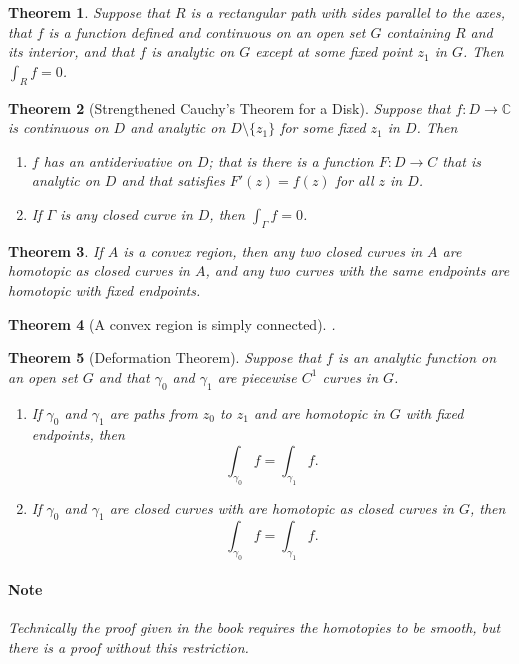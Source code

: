 \documentclass[a4paper]{article}
\newtheorem{theorem}{Theorem}
\newcommand{\C}{\mathbb{C}}
\begin{document}
\begin{theorem}
  Suppose that \(R\) is a rectangular path with sides parallel to the axes, that \(f\) is a function defined and continuous on an open set \(G\) containing \(R\) and its interior, and that \(f\) is analytic on \(G\) except at some fixed point \(z_1\) in \(G\). 
  Then \(\int_R f = 0\).
\end{theorem}






\begin{theorem}[Strengthened Cauchy's Theorem for a Disk]
  Suppose that \(f : D \to \C\) is continuous on \(D\) and analytic on \(D \setminus \{z_1\}\) for some fixed \(z_1\) in \(D\). 
  Then
  \begin{enumerate}
    \item \(f\) has an antiderivative on \(D\); that is there is a function \(F : D \to C\) that is analytic on \(D\) and that satisfies \(F'(z) = f(z)\) for all \(z\) in \(D\).
    \item If \(\Gamma\) is any closed curve in \(D\), then \(\int_\Gamma f = 0\).
  \end{enumerate}
\end{theorem}







\begin{theorem}
  If \(A\) is a convex region, then any two closed curves in \(A\) are homotopic as closed curves in \(A\), and any two curves with the same endpoints are homotopic with fixed endpoints. 
\end{theorem}

\begin{theorem}[A convex region is simply connected].
\end{theorem}

\begin{theorem}[Deformation Theorem]
  Suppose that \(f\) is an analytic function on an open set \(G\) and that \(\gamma_0\) and \(\gamma_1\) are piecewise \(C^1\) curves in \(G\). 
  \begin{enumerate}
    \item If \(\gamma_0 \) and \(\gamma_1\) are paths from \(z_0\) to \(z_1\) and are homotopic in \(G\) with fixed endpoints, then 
      \[\int_{\gamma_0} f = \int_{\gamma_1} f.\]
    \item If \(\gamma_0\) and \(\gamma_1\) are closed curves with are homotopic as closed curves in \(G\), then 
      \[\int_{\gamma_0} f = \int_{\gamma_1} f.\]
  \end{enumerate}

  \paragraph{Note}
  Technically the proof given in the book requires the homotopies to be smooth, but there is a proof without this restriction. 
\end{theorem}
\end{document}
